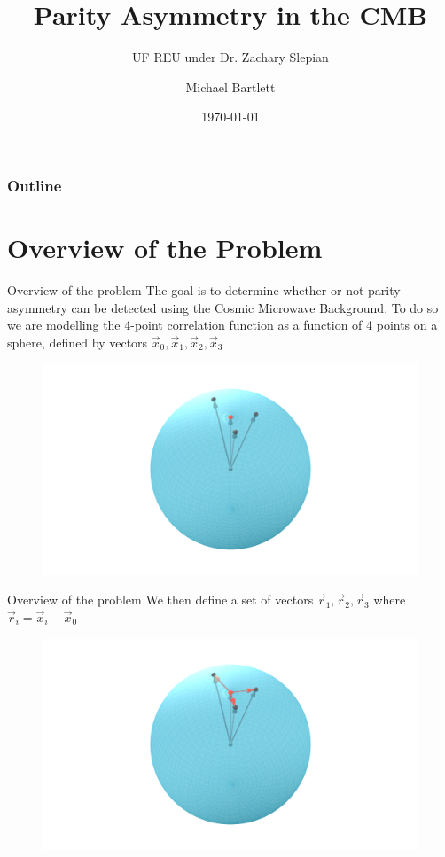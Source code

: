 \documentclass{beamer}
\title{Parity Asymmetry in the CMB}
\subtitle{UF REU under Dr. Zachary Slepian}
\author{Michael Bartlett}
\institute{University of Oklahoma}
\date{\today}
\begin{document}
\begin{frame}
    \titlepage
\end{frame}

\begin{frame}
    \frametitle{Outline}
    \tableofcontents
\end{frame}

\section{Overview of the Problem}
\begin{frame}{Overview of the problem}
    The goal is to determine whether or not parity asymmetry can be detected using the Cosmic Microwave Background.
    To do so we are modelling the 4-point correlation function as a function of 4 points on a sphere, defined by vectors $\vec x_0, \vec x_1, \vec x_2, \vec x_3$
    \begin{figure}
        \centering
        \includegraphics[width=1\textwidth]{media/cmb_sphere_3_ManimCE_v0.17.3.png}
    \end{figure}
\end{frame}

\begin{frame}{Overview of the problem}
    We then define a set of vectors $\vec r_1, \vec r_2, \vec r_3$ where $\vec r_i = \vec x_i - \vec x_0$
    \begin{figure}
        \centering
        \includegraphics[width=1\textwidth]{media/cmb_sphere_4_ManimCE_v0.17.3.png}
    \end{figure}
\end{frame}
\end{document}
